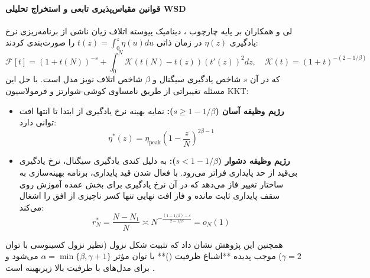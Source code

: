 \paragraph*{قوانین مقیاس‌پذیری تابعی و استخراج تحلیلی WSD}
لی و همکاران \cite{li2026optimal} بر پایه چارچوب ، دینامیک پیوسته اتلاف زیان ناشی از برنامه‌ریزی نرخ یادگیری $\eta(z)$ در زمان ذاتی $t(z) = \int_0^z \eta(u) du$ را صورت‌بندی کردند:
\begin{equation}
    \mathcal{F}[t] = (1 + t(N))^{-s} + \int_0^N \mathcal{K}(t(N) - t(z)) (t'(z))^2 dz, \quad \mathcal{K}(t) = (1 + t)^{-(2 - 1/\beta)}
\end{equation}
که در آن $s$ شاخص یادگیری سیگنال و $\beta$ شاخص اتلاف نویز مدل است. با حل این مسئله تغییراتی از طریق نامساوی کوشی-شوارتز و فرمولاسیون KKT:
\begin{itemize}
    \item \textbf{رژیم وظیفه آسان ($s \ge 1 - 1/\beta$):} نمایه بهینه نرخ یادگیری از ابتدا تا انتها افت توانی دارد:
    \begin{equation}
        \eta^*(z) = \eta_{\text{peak}} \left( 1 - \frac{z}{N} \right)^{2\beta - 1}
    \end{equation}
    \item \textbf{رژیم وظیفه دشوار ($s < 1 - 1/\beta$):} به دلیل کندی یادگیری سیگنال، نرخ یادگیری بی‌قید از حد پایداری فراتر می‌رود. با فعال شدن قید پایداری، برنامه بهینه‌سازی به ساختار  تغییر فاز می‌دهد که در آن نرخ یادگیری برای بخش عمده آموزش روی سقف پایداری ثابت مانده و فاز افت نهایی تنها کسر ناچیزی از افق را اشغال می‌کند:
    \begin{equation}
        r_N^* = \frac{N - N_1}{N} \asymp N^{-\frac{(1 - 1/\beta) - s}{2 - 1/\beta}} = o_N(1)
    \end{equation}
\end{itemize}
همچنین این پژوهش نشان داد که تثبیت شکل نزول (نظیر نزول کسینوسی با توان $\gamma = 2$) موجب پدیده **اشباع ظرفیت ()** با توان مؤثر $\alpha = \min\{\beta, \gamma+1\}$ می‌شود و برای مدل‌های با ظرفیت بالا زیربهینه است \cite{li2026optimal}.

